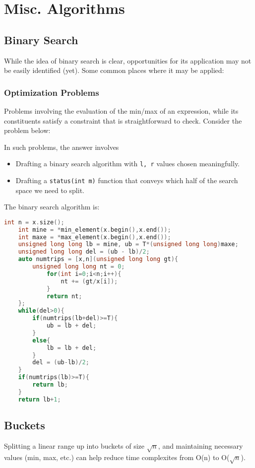 \documentclass{article}
\begin{document}
\section{Misc. Algorithms}
\subsection{Binary Search}
While the idea of binary search is clear, opportunities
for its application may not be easily identified (yet). Some
common places where it may be applied:
\subsubsection*{Optimization Problems}
Problems involving the evaluation of the min/max of an expression,
while its constituents satisfy a constraint that is straightforward to
check. Consider the problem below:\\
\begin{center}
\end{center}
In such problems, the answer involves
\begin{itemize}
    \item Drafting a binary search algorithm with \texttt{l, r} values chosen meaningfully.
    \item Drafting a \texttt{status(int m)} function that
    conveys which half of the search space we need to split.
\end{itemize}
The binary search algorithm is:
\begin{lstlisting}[language=C++,caption=BinSearch]
    int n = x.size();
    int mine = *min_element(x.begin(),x.end());
    int maxe = *max_element(x.begin(),x.end());
    unsigned long long lb = mine, ub = T*(unsigned long long)maxe;
    unsigned long long del = (ub - lb)/2;
    auto numtrips = [x,n](unsigned long long gt){
        unsigned long long nt = 0;
            for(int i=0;i<n;i++){
                nt += (gt/x[i]);
            }
            return nt;
    };
    while(del>0){
        if(numtrips(lb+del)>=T){
            ub = lb + del;
        }
        else{
            lb = lb + del;
        }
        del = (ub-lb)/2;
    }
    if(numtrips(lb)>=T){
        return lb;
    }
    return lb+1;
\end{lstlisting}
\subsection{Buckets}
Splitting a linear range up into buckets of size $\sqrt{n}$, and maintaining
necessary values (min, max, etc.) can help reduce time complexites from O(n)
to O($\sqrt{n}$).
\end{document}
